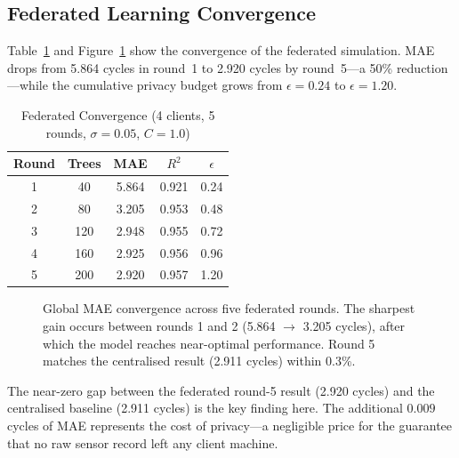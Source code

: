 \documentclass[10pt, journal, letterpaper]{IEEEtran}
\begin{document}
\subsection{Federated Learning Convergence}

Table~\ref{tab:fl} and Figure~\ref{fig:fl_conv} show the convergence of the
federated simulation. MAE drops from 5.864 cycles in round~1 to 2.920 cycles
by round~5—a 50\% reduction—while the cumulative privacy budget grows from
$\epsilon = 0.24$ to $\epsilon = 1.20$.

\begin{table}[htbp]
\caption{Federated Convergence (4 clients, 5 rounds, $\sigma=0.05$, $C=1.0$)}
\label{tab:fl}
\centering\small
\begin{tabular}{ccccc}
\toprule
\textbf{Round} & \textbf{Trees} & \textbf{MAE} & $R^2$ & \textbf{$\epsilon$} \\
\midrule
1 & 40  & 5.864 & 0.921 & 0.24 \\
2 & 80  & 3.205 & 0.953 & 0.48 \\
3 & 120 & 2.948 & 0.955 & 0.72 \\
4 & 160 & 2.925 & 0.956 & 0.96 \\
5 & 200 & 2.920 & 0.957 & 1.20 \\
\bottomrule
\end{tabular}
\end{table}

\begin{figure}[htbp]
\centering
{}
\caption{Global MAE convergence across five federated rounds. The sharpest
gain occurs between rounds 1 and 2 (5.864 $\to$ 3.205 cycles), after which
the model reaches near-optimal performance. Round 5 matches the centralised
result (2.911 cycles) within 0.3\%.}
\label{fig:fl_conv}
\end{figure}

The near-zero gap between the federated round-5 result (2.920 cycles) and
the centralised baseline (2.911 cycles) is the key finding here. The
additional $0.009$ cycles of MAE represents the cost of privacy—a negligible
price for the guarantee that no raw sensor record left any client machine.
\end{document}
